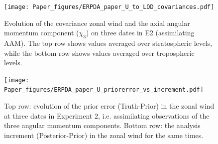  \begin{figure}
	 \texttt{[image: Paper\_figures/ERPDA\_paper\_U\_to\_LOD\_covariances.pdf]}
	 \caption{Evolution of the covariance zonal wind and the axial angular momentum component ($\chi_3$) on three dates in E2 (assimilating AAM). The top row shows values averaged over stratospheric levels, while the bottom row shows values averaged over tropospheric levels.}
 \label{fig:covariances}
\end{figure}

 \begin{figure}
	 \texttt{[image: Paper\_figures/ERPDA\_paper\_U\_priorerror\_vs\_increment.pdf]}
	 \caption{Top row: evolution of the prior error (Truth-Prior) in the zonal wind at three dates in Experiment 2, i.e. assimilating observations of the three angular momentum components. Bottom row: the analysis increment (Posterior-Prior) in the zonal wind for the same times.} 
 \label{fig:error_increments}
\end{figure}


